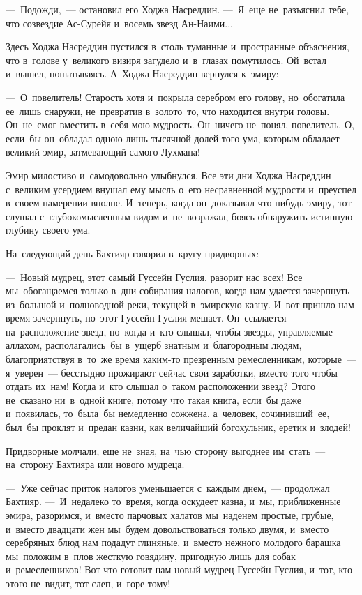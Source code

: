 \documentclass[12pt,a4paper]{book}
\begin{document}
—~Подожди,~— остановил его Ходжа Насреддин. —~Я~еще не~разъяснил тебе, что созвездие Ас-Сурейя и~восемь звезд Ан-Наими...

Здесь Ходжа Насреддин пустился в~столь туманные и~пространные объяснения, что в~голове у~великого визиря загудело и~в~глазах помутилось. Ой~встал и~вышел, пошатываясь. А~Ходжа Насреддин вернулся к~эмиру:

—~О~повелитель! Старость хотя и~покрыла серебром его голову, но~обогатила ее~лишь снаружи, не~превратив в~золото~то, что находится внутри головы. Он~не~смог вместить в~себя мою мудрость. Он~ничего не~понял, повелитель. О, если~бы он~обладал одною лишь тысячной долей того ума, которым обладает великий эмир, затмевающий самого Лухмана!

Эмир милостиво и~самодовольно улыбнулся. Все эти дни Ходжа Насреддин с~великим усердием внушал ему мысль о~его несравненной мудрости и~преуспел в~своем намерении вполне. И~теперь, когда он~доказывал что-нибудь эмиру, тот слушал с~глубокомысленным видом и~не~возражал, боясь обнаружить истинную глубину своего ума.

На~следующий день Бахтияр говорил в~кругу придворных:

—~Новый мудрец, этот самый Гуссейн Гуслия, разорит нас всех! Все мы~обогащаемся только в~дни собирания налогов, когда нам удается зачерпнуть из~большой и~полноводной реки, текущей в~эмирскую казну. И~вот пришло нам время зачерпнуть, но~этот Гуссейн Гуслия мешает. Он~ссылается на~расположение звезд, но~когда и~кто слышал, чтобы звезды, управляемые аллахом, располагались~бы в~ущерб знатным и~благородным людям, благоприятствуя в~то~же время каким-то презренным ремесленникам, которые~— я~уверен~— бесстыдно прожирают сейчас свои заработки, вместо того чтобы отдать их~нам! Когда и~кто слышал о~таком расположении звезд? Этого не~сказано ни~в~одной книге, потому что такая книга, если~бы даже и~появилась, то~была~бы немедленно сожжена, а~человек, сочинивший~ее, был~бы проклят и~предан казни, как величайший богохульник, еретик и~злодей!

Придворные молчали, еще не~зная, на~чью сторону выгоднее им~стать~— на~сторону Бахтияра или нового мудреца.

—~Уже сейчас приток налогов уменьшается с~каждым днем,~— продолжал Бахтияр. —~И~недалеко то~время, когда оскудеет казна, и~мы, приближенные эмира, разоримся, и~вместо парчовых халатов мы~наденем простые, грубые, и~вместо двадцати жен мы~будем довольствоваться только двумя, и~вместо серебряных блюд нам подадут глиняные, и~вместо нежного молодого барашка мы~положим в~плов жесткую говядину, пригодную лишь для собак и~ремесленников! Вот что готовит нам новый мудрец Гуссейн Гуслия, и~тот, кто этого не~видит, тот слеп, и~горе тому!
\end{document}
